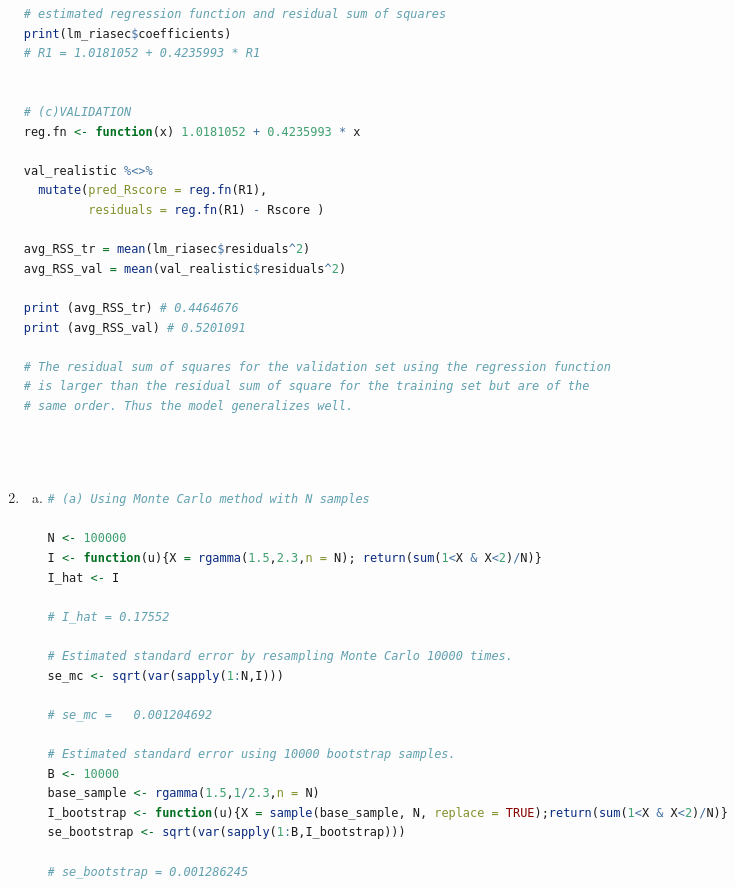 \documentclass[a4paper,10pt]{article}
\theoremstyle{definition}
\begin{document}
\begin{enumerate}
\begin{lstlisting}[language=R,commentstyle=\fontseries{lc}\color{gray}]
# estimated regression function and residual sum of squares
print(lm_riasec$coefficients)
# R1 = 1.0181052 + 0.4235993 * R1


# (c)VALIDATION
reg.fn <- function(x) 1.0181052 + 0.4235993 * x

val_realistic %<>%
  mutate(pred_Rscore = reg.fn(R1),
         residuals = reg.fn(R1) - Rscore )

avg_RSS_tr = mean(lm_riasec$residuals^2)
avg_RSS_val = mean(val_realistic$residuals^2)

print (avg_RSS_tr) # 0.4464676
print (avg_RSS_val) # 0.5201091

# The residual sum of squares for the validation set using the regression function
# is larger than the residual sum of square for the training set but are of the
# same order. Thus the model generalizes well.





\end{lstlisting}
\newpage

\item
\begin{enumerate}[(a)]
\item 

\begin{lstlisting}[language=R,commentstyle=\fontseries{lc}\color{gray}]
# (a) Using Monte Carlo method with N samples

N <- 100000
I <- function(u){X = rgamma(1.5,2.3,n = N); return(sum(1<X & X<2)/N)}
I_hat <- I

# I_hat = 0.17552

# Estimated standard error by resampling Monte Carlo 10000 times.
se_mc <- sqrt(var(sapply(1:N,I)))

# se_mc =   0.001204692

# Estimated standard error using 10000 bootstrap samples.
B <- 10000
base_sample <- rgamma(1.5,1/2.3,n = N)
I_bootstrap <- function(u){X = sample(base_sample, N, replace = TRUE);return(sum(1<X & X<2)/N)}
se_bootstrap <- sqrt(var(sapply(1:B,I_bootstrap)))

# se_bootstrap = 0.001286245




\end{lstlisting}
\end{enumerate}
\end{enumerate}
\end{document}
